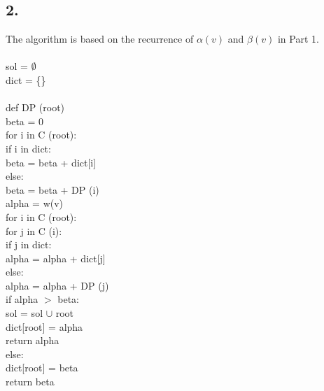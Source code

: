 \documentclass[twoside,11pt]{homework}
\begin{document}
\subsection*{2.}
The algorithm is based on the recurrence of $\alpha(v)$ and $\beta(v)$ in Part 1.
\\\\
sol = $\emptyset$\\
dict = \{\}\\\\
def DP (root)\\
\hspace*{8mm} beta = 0\\
\hspace*{8mm} for i in C (root):\\
\hspace*{16mm} if i in dict:\\
\hspace*{24mm} beta = beta + dict[i] \\
\hspace*{16mm} else:\\
\hspace*{24mm} beta = beta + DP (i) \\
\hspace*{8mm} alpha = w(v)\\
\hspace*{8mm} for i in C (root):\\
\hspace*{16mm} for j in C (i):\\
\hspace*{24mm} if j in dict:\\
\hspace*{32mm} alpha = alpha + dict[j] \\
\hspace*{24mm} else:\\
\hspace*{32mm} alpha = alpha + DP (j) \\
 \hspace*{8mm} if alpha $>$ beta: \\
 \hspace*{16mm} sol = sol $\cup$ root \\
  \hspace*{16mm} dict[root] = alpha \\
  \hspace*{16mm} return alpha\\
 \hspace*{8mm} else:\\
   \hspace*{16mm} dict[root] = beta \\
 \hspace*{16mm} return beta\\
\end{document}

